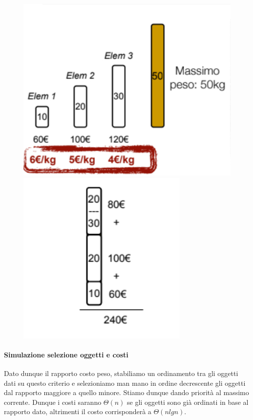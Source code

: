 \documentclass{article}
\begin{document}
\begin{figure}[htbp]
        \center
        \includegraphics[scale=0.5]{img/greedy1.png}
        \includegraphics[scale=0.5]{img/greedy2.png}
\end{figure}

\newpage

\paragraph{Simulazione selezione oggetti e costi} Dato dunque il rapporto costo peso, stabiliamo un ordinamento tra gli oggetti dati su questo criterio e selezioniamo man mano in ordine decrescente gli oggetti dal rapporto maggiore a quello minore. Stiamo dunque dando priorità al massimo corrente. Dunque i costi saranno $\Theta(n)$ se gli oggetti sono già ordinati in base al rapporto dato, altrimenti il costo corrisponderà a $\Theta(nlgn)$.
\end{document}
